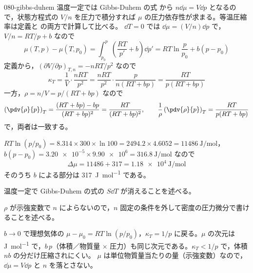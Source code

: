 \documentclass[uplatex,dvipdfmx,a4paper,11pt]{jsarticle}
\begin{document}
\begin{kaisetsu}{080-gibbs-duhem}
\houshin 温度一定では Gibbs-Duhem の式  から $n\dd\mu = V\dd p$ となるので，状態方程式の $V/n$ を圧力で積分すれば $\mu$ の圧力依存性が求まる。等温圧縮率は定義と  の両方で計算して比べる。
\keisan {} $\dd T = 0$ では $\dd\mu = (V/n)\dd p$ で，$V/n = RT/p + b$ なので
\[ \mu(T,p) - \mu(T,p_{0}) = \int_{p_{0}}^{p}\left(\frac{RT}{p'} + b\right)\dd p' = RT\ln\frac{p}{p_{0}} + b(p - p_{0}) \]
 定義から，$(\partial V/\partial p)_{T,n} = -nRT/p^{2}$ なので
\[ \kappa_{T} = \frac{1}{V}\cdot\frac{nRT}{p^{2}} = \frac{nRT}{p^{2}}\cdot\frac{p}{n(RT + bp)} = \frac{RT}{p(RT + bp)} \]
一方，$\rho = n/V = p/(RT + bp)$ なので
\[ \left(\pdv{\rho}{p}\right)_{T} = \frac{(RT + bp) - bp}{(RT + bp)^{2}} = \frac{RT}{(RT + bp)^{2}}, \qquad \frac{1}{\rho}\left(\pdv{\rho}{p}\right)_{T} = \frac{RT}{p(RT + bp)} \]
で，両者は一致する。

 $RT\ln(p/p_{0}) = 8.314 \times 300 \times \ln 100 = 2494.2 \times 4.6052 = \qty{11486}{\joule\per\mole}$，$b(p - p_{0}) = \num{3.20e-5} \times \num{9.90e6} = \qty{316.8}{\joule\per\mole}$ なので
\[ \Delta\mu = 11486 + 317 = \qty{1.18e4}{\joule\per\mole} \]
そのうち $b$ による部分は \qty{317}{\joule\per\mole} である。
\begin{ronten}
  \item {} 温度一定で Gibbs-Duhem の式の $S\dd T$ が消えることを述べる。
  \item {} $\rho$ が示強変数で $n$ によらないので，$n$ 固定の条件を外して密度の圧力微分で書けることを述べる。
\end{ronten}
\kenzan $b \to 0$ で理想気体の $\mu - \mu_{0} = RT\ln(p/p_{0})$，$\kappa_{T} = 1/p$ に戻る。$\mu$ の次元は \unit{\joule\per\mole} で，$b\,p$（体積／物質量 × 圧力）も同じ次元である。$\kappa_{T} < 1/p$ で，体積 $nb$ の分だけ圧縮されにくい。
\tsumazuki $\mu$ は単位物質量当たりの量（示強変数）なので，$\dd\mu = V\dd p$ と $n$ を落とさない。
\end{kaisetsu}
\end{document}
